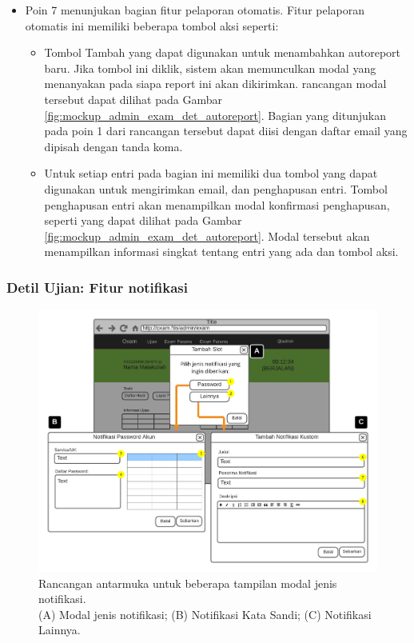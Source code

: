 \begin{itemize}
        \item Poin 7 menunjukan bagian fitur pelaporan otomatis. Fitur pelaporan
            otomatis ini memiliki beberapa tombol aksi seperti:
           \begin{itemize}
               \item Tombol Tambah yang dapat digunakan untuk menambahkan
                    autoreport baru. Jika tombol ini diklik, sistem akan
                    memunculkan modal yang menanyakan pada siapa report ini akan
                    dikirimkan. rancangan modal tersebut dapat dilihat pada
                    Gambar \ref{fig:mockup_admin_exam_det_autoreport}. Bagian
                    yang ditunjukan pada poin 1 dari rancangan tersebut dapat
                    diisi dengan daftar email yang dipisah dengan tanda koma.
                    
                \item Untuk setiap entri pada bagian ini memiliki dua tombol
                    yang dapat digunakan untuk mengirimkan email, dan
                    penghapusan entri. Tombol penghapusan entri akan menampilkan
                    modal konfirmasi penghapusan, seperti yang dapat dilihat
                    pada Gambar \ref{fig:mockup_admin_exam_det_autoreport}.
                    Modal tersebut akan menampilkan informasi singkat tentang
                    entri yang ada dan tombol aksi.
           \end{itemize}
    \end{itemize}
    
\subsubsection{Detil Ujian: Fitur notifikasi}
    \begin{figure}
        \centering
        \includegraphics{Gambar/mockups/Mockup--Admin - Notif.pdf}
        \caption{Rancangan antarmuka untuk beberapa tampilan modal jenis
        notifikasi. \\
            (A) Modal jenis notifikasi; (B) Notifikasi Kata Sandi; (C)
            Notifikasi Lainnya.}
        \label{fig:mockup_admin_exam_det_notif}
    \end{figure}
    
